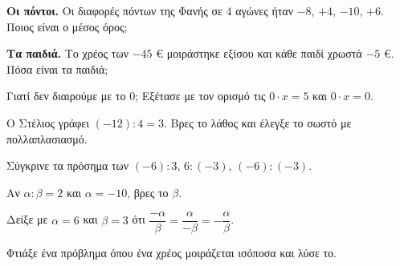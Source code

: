 \ex \textbf{Οι πόντοι.} Οι διαφορές πόντων της Φανής σε $4$ αγώνες ήταν $-8$, $+4$, $-10$, $+6$. Ποιος είναι ο μέσος όρος;

\ex \textbf{Τα παιδιά.} Το χρέος των $-45$ € μοιράστηκε εξίσου και κάθε παιδί χρωστά $-5$ €. Πόσα είναι τα παιδιά;


\ex Γιατί δεν διαιρούμε με το $0$; Εξέτασε με τον ορισμό τις $0\cdot x=5$ και $0\cdot x=0$.

\ex Ο Στέλιος γράφει $(-12):4=3$. Βρες το λάθος και έλεγξε το σωστό με πολλαπλασιασμό.

\ex Σύγκρινε τα πρόσημα των $(-6):3$, $6:(-3)$, $(-6):(-3)$.

\ex Αν $\alpha:\beta=2$ και $\alpha=-10$, βρες το $\beta$.

\ex Δείξε με $\alpha=6$ και $\beta=3$ ότι $\dfrac{-\alpha}{\beta}=\dfrac{\alpha}{-\beta}=-\dfrac{\alpha}{\beta}$.


\ex Φτιάξε ένα πρόβλημα όπου ένα χρέος μοιράζεται ισόποσα και λύσε το.
